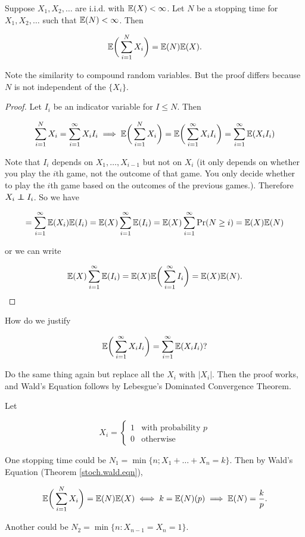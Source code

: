 \begin{theorem}\label{stoch.wald.eqn}Suppose \(X_1, X_2, \ldots\) are i.i.d. with \(\mathbb{E}(X) < \infty\). Let \(N\) be a stopping time for \(X_1, X_2, \ldots\) such that \(\mathbb{E}(N) < \infty\). Then

\[
\mathbb{E} \bigg( \sum_{i=1}^N X_i \bigg) = \mathbb{E}(N) \mathbb{E}(X).
\]

\end{theorem}

\begin{remark}Note the similarity to compound random variables. But the proof differs because \(N\) is not independent of the \(\{X_i\}\).

\end{remark}

\begin{proof} Let \(I_i\) be an indicator variable for \(I \leq N\). Then

\[
\sum_{i=1}^N X_i = \sum_{i=1}^\infty X_i I_i \implies \mathbb{E} \bigg( \sum_{i=1}^N X_i \bigg) = \mathbb{E} \bigg(  \sum_{i=1}^\infty X_i I_i \bigg) =  \sum_{i=1}^\infty \mathbb{E}(X_i I_i)
\]

Note that \(I_i\) depends on \(X_1, \ldots, X_{i-1}\) but not on \(X_i\) (it only depends on whether you play the \(i\)th game, not the outcome of that game. You only decide whether to play the \(i\)th game based on the outcomes of the previous games.). Therefore \(X_i \indep I_i\). So we have

\[
=  \sum_{i=1}^\infty \mathbb{E}(X_i) \mathbb{E}( I_i) =   \mathbb{E}(X)  \sum_{i=1}^\infty\mathbb{E}( I_i) =   \mathbb{E}(X)  \sum_{i=1}^\infty\Pr(N \geq i) = \mathbb{E}(X) \mathbb{E}(N)
\]

or we can write

\[
\mathbb{E}(X)  \sum_{i=1}^\infty\mathbb{E}( I_i)  = \mathbb{E}(X) \mathbb{E} \bigg( \sum_{i=1}^\infty I_i \bigg)  = \mathbb{E}(X) \mathbb{E}(N) .
\]

\end{proof}

\begin{remark}How do we justify 

\[
\mathbb{E} \bigg(  \sum_{i=1}^\infty X_i I_i \bigg) =  \sum_{i=1}^\infty \mathbb{E}(X_i I_i)?
\]

Do the same thing again but replace all the \(X_i\) with \(|X_i|\). Then the proof works, and Wald's Equation follows by Lebesgue's Dominated Convergence Theorem.

\end{remark}

\begin{example} Let

\[
X_i = \begin{cases}
1 & \text{with probability } p \\
0 & \text{otherwise}
\end{cases}
\]

One stopping time could be \(N_1 = \min \{n; X_1 + \ldots + X_n = k\}\). Then by Wald's Equation (Theorem \ref{stoch.wald.eqn}),

\[
\mathbb{E} \bigg( \sum_{i=1}^N X_i \bigg) = \mathbb{E}(N) \mathbb{E}(X) \iff k = \mathbb{E}(N) (p) \implies \mathbb{E}(N) = \frac{k}{p}.
\]

Another could be \(N_2 = \min \{n: X_{n-1} = X_n = 1\}\).

\end{example}

